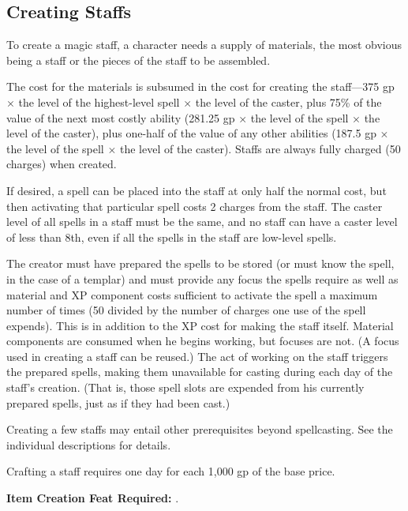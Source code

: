 \subsection{Creating Staffs}
To create a magic staff, a character needs a supply of materials, the most obvious being a staff or the pieces of the staff to be assembled.

The cost for the materials is subsumed in the cost for creating the staff---375 gp $\times$ the level of the highest-level spell $\times$ the level of the caster, plus 75\% of the value of the next most costly ability (281.25 gp $\times$ the level of the spell $\times$ the level of the caster), plus one-half of the value of any other abilities (187.5 gp $\times$ the level of the spell $\times$ the level of the caster). Staffs are always fully charged (50 charges) when created.

If desired, a spell can be placed into the staff at only half the normal cost, but then activating that particular spell costs 2 charges from the staff. The caster level of all spells in a staff must be the same, and no staff can have a caster level of less than 8th, even if all the spells in the staff are low-level spells.

The creator must have prepared the spells to be stored (or must know the spell, in the case of a templar) and must provide any focus the spells require as well as material and XP component costs sufficient to activate the spell a maximum number of times (50 divided by the number of charges one use of the spell expends). This is in addition to the XP cost for making the staff itself. Material components are consumed when he begins working, but focuses are not. (A focus used in creating a staff can be reused.) The act of working on the staff triggers the prepared spells, making them unavailable for casting during each day of the staff's creation. (That is, those spell slots are expended from his currently prepared spells, just as if they had been cast.)

Creating a few staffs may entail other prerequisites beyond spellcasting. See the individual descriptions for details.

Crafting a staff requires one day for each 1,000 gp of the base price.

\textbf{Item Creation Feat Required:} .

